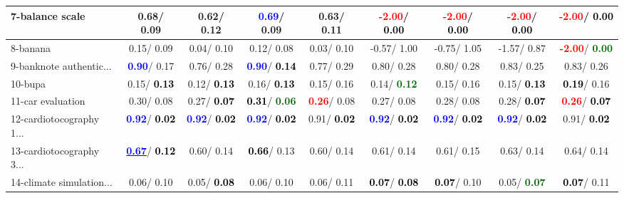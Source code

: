 \begin{table}[h]
\begin{center}
\begin{tabular}{lc|c|c|c|c|c|c|c}
7-balance scale &   0.68/  0.09 &   0.62/  0.12 & \textcolor{blue}{\textbf{  0.69}}/  0.09 &   0.63/  0.11 & \textcolor{red}{\textbf{ -2.00}}/\textcolor{black}{\textbf{  0.00}} & \textcolor{red}{\textbf{ -2.00}}/\textcolor{black}{\textbf{  0.00}} & \textcolor{red}{\textbf{ -2.00}}/\textcolor{black}{\textbf{  0.00}} & \textcolor{red}{\textbf{ -2.00}}/\textcolor{black}{\textbf{  0.00}} \\ \hline
8-banana &   0.15/  0.09 &   0.04/  0.10 &   0.12/  0.08 &   0.03/  0.10 &  -0.57/  1.00 &  -0.75/  1.05 &  -1.57/  0.87 & \textcolor{red}{\textbf{ -2.00}}/\textcolor{darkgreen}{\textbf{  0.00}} \\
9-banknote authentic... & \textcolor{blue}{\textbf{  0.90}}/  0.17 &   0.76/  0.28 & \textcolor{blue}{\textbf{  0.90}}/\textcolor{black}{\textbf{  0.14}} &   0.77/  0.29 &   0.80/  0.28 &   0.80/  0.28 &   0.83/  0.25 &   0.83/  0.26 \\
10-bupa &   0.15/\textcolor{black}{\textbf{  0.13}} &   0.12/\textcolor{black}{\textbf{  0.13}} &   0.16/\textcolor{black}{\textbf{  0.13}} &   0.15/  0.16 &   0.14/\textcolor{darkgreen}{\textbf{  0.12}} &   0.15/  0.16 &   0.15/\textcolor{black}{\textbf{  0.13}} & \textcolor{black}{\textbf{  0.19}}/  0.16 \\
11-car evaluation &   0.30/  0.08 &   0.27/\textcolor{black}{\textbf{  0.07}} & \textcolor{black}{\textbf{  0.31}}/\textcolor{darkgreen}{\textbf{  0.06}} & \textcolor{red}{\textbf{  0.26}}/  0.08 &   0.27/  0.08 &   0.28/  0.08 &   0.28/\textcolor{black}{\textbf{  0.07}} & \textcolor{red}{\textbf{  0.26}}/\textcolor{black}{\textbf{  0.07}} \\
12-cardiotocography 1... & \textcolor{blue}{\textbf{  0.92}}/\textcolor{black}{\textbf{  0.02}} & \textcolor{blue}{\textbf{  0.92}}/\textcolor{black}{\textbf{  0.02}} & \textcolor{blue}{\textbf{  0.92}}/\textcolor{black}{\textbf{  0.02}} &   0.91/\textcolor{black}{\textbf{  0.02}} & \textcolor{blue}{\textbf{  0.92}}/\textcolor{black}{\textbf{  0.02}} & \textcolor{blue}{\textbf{  0.92}}/\textcolor{black}{\textbf{  0.02}} & \textcolor{blue}{\textbf{  0.92}}/\textcolor{black}{\textbf{  0.02}} &   0.91/\textcolor{black}{\textbf{  0.02}} \\
13-cardiotocography 3... & \underline{\textcolor{blue}{\textbf{  0.67}}}/\textcolor{black}{\textbf{  0.12}} &   0.60/  0.14 & \textcolor{black}{\textbf{  0.66}}/  0.13 &   0.60/  0.14 &   0.61/  0.14 &   0.61/  0.15 &   0.63/  0.14 &   0.64/  0.14 \\
14-climate simulation... &   0.06/  0.10 &   0.05/\textcolor{black}{\textbf{  0.08}} &   0.06/  0.10 &   0.06/  0.11 & \textcolor{black}{\textbf{  0.07}}/\textcolor{black}{\textbf{  0.08}} & \textcolor{black}{\textbf{  0.07}}/  0.10 &   0.05/\textcolor{darkgreen}{\textbf{  0.07}} & \textcolor{black}{\textbf{  0.07}}/  0.11 \\ \hline

\end{tabular}
\end{center}
\end{table}

